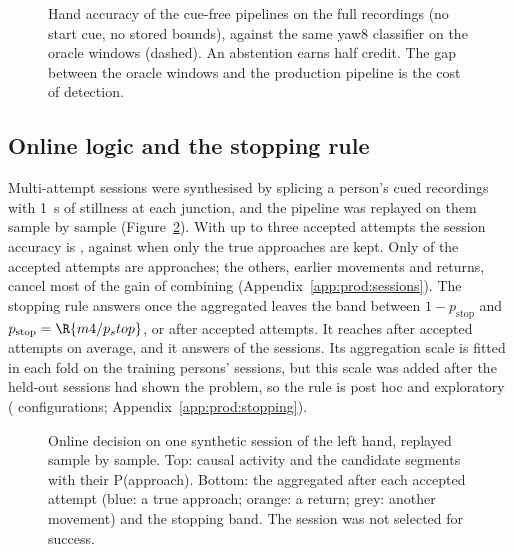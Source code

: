 \begin{figure}[htbp]
\centering
{}
\caption{Hand accuracy of the cue-free pipelines on the full recordings (no start cue, no stored bounds), against
the same yaw8 classifier on the oracle windows (dashed). An abstention earns half credit. The gap between the
oracle windows and the production pipeline is the cost of detection.}
\label{fig:M4_02_accuracy_ladder}
\end{figure}

\subsection{Online logic and the stopping rule}\label{sec:production:stopping}
Multi-attempt sessions were synthesised by splicing a person's cued recordings with 1~s of stillness at each
junction, and the pipeline was replayed on them sample by sample (Figure~\ref{fig:M4_08_timeline}). With up to three
accepted attempts the session accuracy is , against  when only the
true approaches are kept. Only  of the accepted attempts are approaches; the others, earlier
movements and returns, cancel most of the gain of combining (Appendix~\ref{app:prod:sessions}). The stopping rule
answers once the aggregated \pright{} leaves the band between $1 - p_{\mathrm{stop}}$ and $p_{\mathrm{stop}} =
\R{m4/p_stop}$, or after  accepted attempts. It reaches  after
 accepted attempts on average, and it answers  of the sessions. Its
aggregation scale is fitted in each fold on the training persons' sessions, but this scale was added after the
held-out sessions had shown the problem, so the rule is post hoc and exploratory (
configurations; Appendix~\ref{app:prod:stopping}).

\begin{figure}[htbp]
\centering
{}
\caption{Online decision on one synthetic session of the left hand, replayed sample by sample. Top: causal activity
and the candidate segments with their P(approach). Bottom: the aggregated \pright{} after each accepted attempt
(blue: a true approach; orange: a return; grey: another movement) and the stopping band. The session was not
selected for success.}
\label{fig:M4_08_timeline}
\end{figure}

